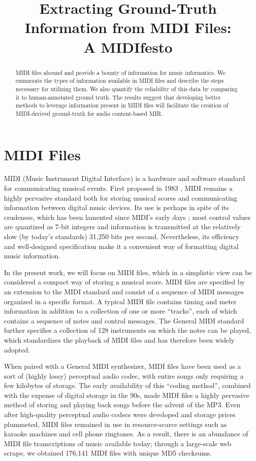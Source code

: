 \documentclass{article}
\title{Extracting Ground-Truth Information from MIDI Files:\\A MIDIfesto}
\begin{document}
\maketitle

\begin{abstract}
MIDI files abound and provide a bounty of information for music informatics.
We enumerate the types of information available in MIDI files and describe the steps necessary for utilizing them.
We also quantify the reliability of this data by comparing it to human-annotated ground truth.
The results suggest that developing better methods to leverage information present in MIDI files will facilitate the creation of MIDI-derived ground-truth for audio content-based MIR.
\end{abstract}

\section{MIDI Files}\label{sec:introduction}

MIDI (Music Instrument Digital Interface) is a hardware and software standard for communicating musical events.
First proposed in 1983 \cite{international1983midi}, MIDI remains a highly pervasive standard both for storing musical scores and communicating information between digital music devices.
Its use is perhaps in spite of its crudeness, which has been lamented since MIDI's early days \cite{moore1988dysfunctions}; most control values are quantized as 7-bit integers and information is transmitted at the relatively slow (by today's standards) 31,250 bits per second.
Nevertheless, its efficiency and well-designed specification make it a convenient way of formatting digital music information.

In the present work, we will focus on MIDI files, which in a simplistic view can be considered a compact way of storing a musical score.
MIDI files are specified by an extension to the MIDI standard \cite{international1988standard} and consist of a sequence of MIDI messages organized in a specific format.
A typical MIDI file contains timing and meter information in addition to a collection of one or more ``tracks'', each of which contains a sequence of notes and control messages.
The General MIDI standard further specifies a collection of 128 instruments on which the notes can be played, which standardizes the playback of MIDI files and has therefore been widely adopted.

When paired with a General MIDI synthesizer, MIDI files have been used as a sort of (highly lossy) perceptual audio codec, with entire songs only requiring a few kilobytes of storage.
The early availability of this ``coding method'', combined with the expense of digital storage in the 90s, made MIDI files a highly pervasive method of storing and playing back songs before the advent of the MP3.
Even after high-quality perceptual audio codecs were developed and storage prices plummeted, MIDI files remained in use in resource-scarce settings such as karaoke machines and cell phone ringtones.
As a result, there is an abundance of MIDI file transcriptions of music available today; through a large-scale web scrape, we obtained 176,141 MIDI files with unique MD5 checksums.
\end{document}
